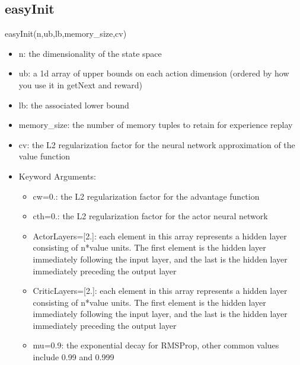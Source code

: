 \documentclass[a4paper]{article}
\begin{document}
\subsection{easyInit}
easyInit(n,ub,lb,memory\_size,cv)
\begin{itemize}
\item n: the dimensionality of the state space
\item ub: a 1d array of upper bounds on each action dimension (ordered by how you use it in getNext and reward)
\item lb: the associated lower bound
\item memory\_size: the number of memory tuples to retain for experience replay
\item cv: the L2 regularization factor for the neural network approximation of the value function
\item Keyword Arguments:
	\begin{itemize}
	\item cw=0.: the L2 regularization factor for the advantage function
	\item cth=0.: the L2 regularization factor for the actor neural network
	\item ActorLayers=[2.]: each element in this array represents a hidden layer consisting of n*value units. The first element is the hidden layer immediately following the input layer, and the last is the hidden layer immediately preceding the output layer
	\item CriticLayers=[2.]: each element in this array represents a hidden layer consisting of n*value units. The first element is the hidden layer immediately following the input layer, and the last is the hidden layer immediately preceding the output layer
	\item mu=0.9: the exponential decay for RMSProp, other common values include 0.99 and 0.999
	\end{itemize}
\end{itemize}
\end{document}
